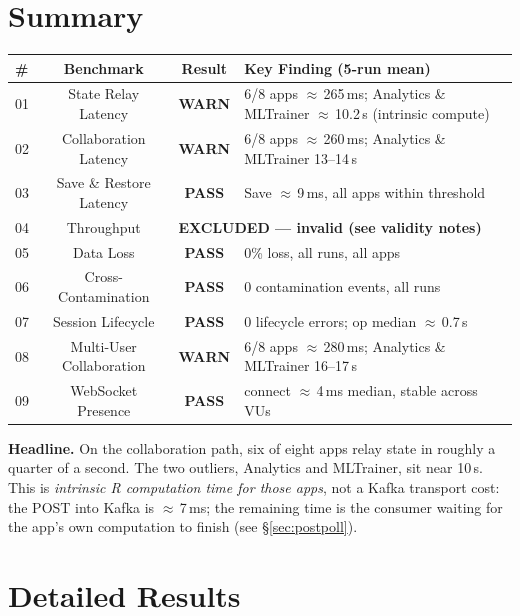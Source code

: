 \documentclass[11pt,a4paper]{article}
\newcommand{\pass}{\textcolor{pass}{\textbf{PASS}}}
\newcommand{\warn}{\textcolor{warn}{\textbf{WARN}}}
\begin{document}
\section{Summary}

\begin{tabularx}{\textwidth}{@{}lccX@{}}
\toprule
\textbf{\#} & \textbf{Benchmark} & \textbf{Result} & \textbf{Key Finding (5-run mean)} \\
\midrule
01 & State Relay Latency       & \warn & 6/8 apps $\approx$\,265\,ms; Analytics \& MLTrainer $\approx$\,10.2\,s (intrinsic compute) \\
02 & Collaboration Latency     & \warn & 6/8 apps $\approx$\,260\,ms; Analytics \& MLTrainer 13--14\,s \\
03 & Save \& Restore Latency   & \pass & Save $\approx$\,9\,ms, all apps within threshold \\
04 & Throughput                 & \multicolumn{2}{l}{\textbf{EXCLUDED — invalid (see validity notes)}} \\
05 & Data Loss                 & \pass & 0\% loss, all runs, all apps \\
06 & Cross-Contamination       & \pass & 0 contamination events, all runs \\
07 & Session Lifecycle          & \pass & 0 lifecycle errors; op median $\approx$\,0.7\,s \\
08 & Multi-User Collaboration   & \warn & 6/8 apps $\approx$\,280\,ms; Analytics \& MLTrainer 16--17\,s \\
09 & WebSocket Presence         & \pass & connect $\approx$\,4\,ms median, stable across VUs \\
\bottomrule
\end{tabularx}

\medskip
\noindent\textbf{Headline.} On the collaboration path, six of eight apps relay
state in roughly a quarter of a second. The two outliers, Analytics and
MLTrainer, sit near 10\,s. This is \emph{intrinsic R computation time for those
apps}, not a Kafka transport cost: the POST into Kafka is $\approx$\,7\,ms; the
remaining time is the consumer waiting for the app's own computation to finish
(see \S\ref{sec:postpoll}).

\section{Detailed Results}
\end{document}
